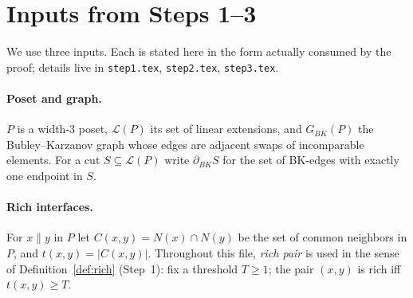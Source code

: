
\begin{abstract}
Step 4 of the width-3 BK-expansion program:
if two rich interfaces of a low-conductance cut $S\subseteq\mathcal L(P)$
induce incoherent local monotone rules on a positive-mass overlap, then
the cut $S$ has BK boundary at least proportional to the incoherent overlap mass.
We state Step~4 in theorem/lemma form and separate the hypotheses
supplied by Steps~1--3 from the technical subclaims proved here.
\end{abstract}


\section{Inputs from Steps 1--3}
\label{sec:inputs-step4}

We use three inputs. Each is stated here in the form actually consumed by
the proof; details live in \texttt{step1.tex}, \texttt{step2.tex},
\texttt{step3.tex}.

\paragraph{Poset and graph.}
$P$ is a width-3 poset, $\mathcal L(P)$ its set of linear extensions,
and $G_{BK}(P)$ the Bubley--Karzanov graph whose edges are adjacent
swaps of incomparable elements. For a cut $S\subseteq\mathcal L(P)$ write
$\partial_{BK}S$ for the set of BK-edges with exactly one endpoint in $S$.

\paragraph{Rich interfaces.}
For $x\parallel y$ in $P$ let $C(x,y)=N(x)\cap N(y)$ be the set of common
neighbors in $P$, and $t(x,y)=|C(x,y)|$. Throughout this file,
\emph{rich pair} is used in the sense of Definition~\ref{def:rich}
(Step~1): fix a threshold $T\ge 1$; the pair $(x,y)$ is rich iff
$t(x,y)\ge T$.

